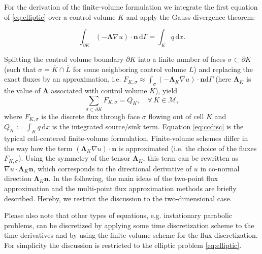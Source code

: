 For the derivation of the finite-volume formulation we integrate the first equation of \eqref{eq:elliptic} over a control volume $K$ and apply the Gauss divergence theorem:

\begin{equation}
    \int_{\partial K} \left( - \mathbf{\Lambda} \nabla u \right) \cdot \mathbf{n} \, \mathrm{d} \Gamma = \int_K q \, \mathrm{d}x.
    \label{eq:ellipticIntegrated}
\end{equation}

Splitting the control volume boundary $\partial K$ into a finite number of faces $\sigma \subset \partial K$ (such that $\sigma = \overline{K} \cap \overline{L}$ for some neighboring control volume $L$) and replacing the exact fluxes by an approximation, i.e. $F_{K, \sigma} \approx \int_{\sigma} \left( - \mathbf{\Lambda}_K \nabla u \right) \cdot \mathbf{n} \mathrm{d} \Gamma$ (here $\mathbf{\Lambda}_K$ is the value of $\mathbf{\Lambda}$ associated with control volume $K$), yield
\begin{equation}
    \sum_{\sigma \subset \partial K} F_{K, \sigma} = Q_K, \quad \forall \, {K \in \mathcal{M}},
\label{eq:ccdisc}
\end{equation}
where $F_{K, \sigma}$ is the discrete flux through face $\sigma$ flowing out of cell $K$ and $Q_K := \int_K q \, \mathrm{d}x$ is the integrated source/sink term. Equation \eqref{eq:ccdisc} is the typical cell-centered finite-volume formulation. 
Finite-volume schemes differ in the way how the term 
$(\mathbf{\Lambda}_K \nabla u ) \cdot \mathbf{n} $ is approximated (i.e. the choice of the fluxes $F_{K, \sigma}$). Using the symmetry of the tensor $\mathbf{\Lambda}_K$, this term can be rewritten as 
$\nabla u  \cdot \mathbf{\Lambda}_K\mathbf{n}$, which corresponds to the directional derivative of $u$ in co-normal direction $\mathbf{\Lambda}_K\mathbf{n}$. 
In the following, the main ideas of the two-point flux approximation and the multi-point flux approximation methods are briefly described. Hereby, we restrict the discussion to the two-dimensional case.

Please also note that other types of equations, e.g. instationary parabolic problems, can be discretized by applying some time discretization scheme to the time derivatives and by using the finite-volume scheme for the flux discretization. For simplicity the discussion is restricted to the elliptic problem \eqref{eq:elliptic}.

